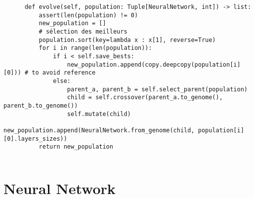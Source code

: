 \documentclass[11pt,a4paper]{article}
\begin{document}
\begin{verbatim}
      def evolve(self, population: Tuple[NeuralNetwork, int]) -> list:
          assert(len(population) != 0)
          new_population = []
          # sélection des meilleurs
          population.sort(key=lambda x : x[1], reverse=True)
          for i in range(len(population)):
              if i < self.save_bests:
                  new_population.append(copy.deepcopy(population[i][0])) # to avoid reference
              else:
                  parent_a, parent_b = self.select_parent(population)
                  child = self.crossover(parent_a.to_genome(), parent_b.to_genome())
                  self.mutate(child)
                  new_population.append(NeuralNetwork.from_genome(child, population[i][0].layers_sizes))
          return new_population
  
\end{verbatim}

\section{Neural Network}
\end{document}
